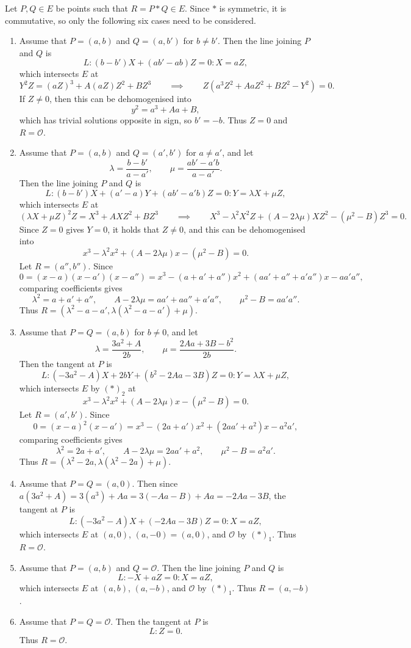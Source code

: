 \documentclass{article}
\newcommand{\rb}[1]{\left( #1 \right)}
\theoremstyle{definition}\newtheorem*{definition}{Definition}
\theoremstyle{definition}\newtheorem*{example}{Example}
\theoremstyle{definition}\newtheorem*{remark}{Remark}
\begin{document}
Let $ P, Q \in E $ be points such that $ R = P * Q \in E $. Since $ * $ is symmetric, it is commutative, so only the following six cases need to be considered.
\begin{enumerate}[label=$ \rb{*}_\arabic* $]
\item Assume that $ P = \rb{a, b} $ and $ Q = \rb{a, b'} $ for $ b \ne b' $. Then the line joining $ P $ and $ Q $ is
$$ L : \rb{b - b'}X + \rb{ab' - ab}Z = 0 : X = aZ, $$
which intersects $ E $ at
$$ Y^2Z = \rb{aZ}^3 + A\rb{aZ}Z^2 + BZ^3 \qquad \implies \qquad Z\rb{a^3Z^2 + AaZ^2 + BZ^2 - Y^2} = 0. $$
If $ Z \ne 0 $, then this can be dehomogenised into
$$ y^2 = a^3 + Aa + B, $$
which has trivial solutions opposite in sign, so $ b' = -b $. Thus $ Z = 0 $ and $ R = \mathcal{O} $.
\item Assume that $ P = \rb{a, b} $ and $ Q = \rb{a', b'} $ for $ a \ne a' $, and let
$$ \lambda = \dfrac{b - b'}{a - a'}, \qquad \mu = \dfrac{ab' - a'b}{a - a'}. $$
Then the line joining $ P $ and $ Q $ is
$$ L : \rb{b - b'}X + \rb{a' - a}Y + \rb{ab' - a'b}Z = 0 : Y = \lambda X + \mu Z, $$
which intersects $ E $ at
$$ \rb{\lambda X + \mu Z}^2Z = X^3 + AXZ^2 + BZ^3 \qquad \implies \qquad X^3 - \lambda^2X^2Z + \rb{A - 2\lambda\mu}XZ^2 - \rb{\mu^2 - B}Z^3 = 0. $$
Since $ Z = 0 $ gives $ Y = 0 $, it holds that $ Z \ne 0 $, and this can be dehomogenised into
$$ x^3 - \lambda^2x^2 + \rb{A - 2\lambda\mu}x - \rb{\mu^2 - B} = 0. $$
Let $ R = \rb{a'', b''} $. Since
$$ 0 = \rb{x - a}\rb{x - a'}\rb{x - a''} = x^3 - \rb{a + a' + a''}x^2 + \rb{aa' + a'' + a'a''}x - aa'a'', $$
comparing coefficients gives
$$ \lambda^2 = a + a' + a'', \qquad A - 2\lambda\mu = aa' + aa'' + a'a'', \qquad \mu^2 - B = aa'a''. $$
Thus $ R = \rb{\lambda^2 - a - a', \lambda\rb{\lambda^2 - a - a'} + \mu} $.
\item Assume that $ P = Q = \rb{a, b} $ for $ b \ne 0 $, and let
$$ \lambda = \dfrac{3a^2 + A}{2b}, \qquad \mu = \dfrac{2Aa + 3B - b^2}{2b}. $$
Then the tangent at $ P $ is
$$ L : \rb{-3a^2 - A}X + 2bY + \rb{b^2 - 2Aa - 3B}Z = 0 : Y = \lambda X + \mu Z, $$
which intersects $ E $ by $ \rb{*}_2 $ at
$$ x^3 - \lambda^2x^2 + \rb{A - 2\lambda\mu}x - \rb{\mu^2 - B} = 0. $$
Let $ R = \rb{a', b'} $. Since
$$ 0 = \rb{x - a}^2\rb{x - a'} = x^3 - \rb{2a + a'}x^2 + \rb{2aa' + a^2}x - a^2a', $$
comparing coefficients gives
$$ \lambda^2 = 2a + a', \qquad A - 2\lambda\mu = 2aa' + a^2, \qquad \mu^2 - B = a^2a'. $$
Thus $ R = \rb{\lambda^2 - 2a, \lambda\rb{\lambda^2 - 2a} + \mu} $.
\item Assume that $ P = Q = \rb{a, 0} $. Then since $ a\rb{3a^2 + A} = 3\rb{a^3} + Aa = 3\rb{-Aa - B} + Aa = -2Aa - 3B $, the tangent at $ P $ is
$$ L : \rb{-3a^2 - A}X + \rb{-2Aa - 3B}Z = 0 : X = aZ, $$
which intersects $ E $ at $ \rb{a, 0} $, $ \rb{a, -0} = \rb{a, 0} $, and $ \mathcal{O} $ by $ \rb{*}_1 $. Thus $ R = \mathcal{O} $.
\item Assume that $ P = \rb{a, b} $ and $ Q = \mathcal{O} $. Then the line joining $ P $ and $ Q $ is
$$ L : -X + aZ = 0 : X = aZ, $$
which intersects $ E $ at $ \rb{a, b} $, $ \rb{a, -b} $, and $ \mathcal{O} $ by $ \rb{*}_1 $. Thus $ R = \rb{a, -b} $.
\item Assume that $ P = Q = \mathcal{O} $. Then the tangent at $ P $ is
$$ L : Z = 0. $$
Thus $ R = \mathcal{O} $.
\end{enumerate}
\end{document}
